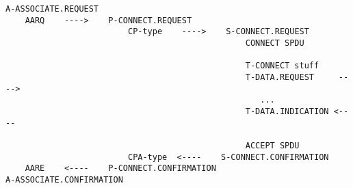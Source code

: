 \begin{bwslide}

\scriptsize
\begin{verbatim}
A-ASSOCIATE.REQUEST
    AARQ    ---->    P-CONNECT.REQUEST
                         CP-type    ---->    S-CONNECT.REQUEST
                                                 CONNECT SPDU

                                                 T-CONNECT stuff
                                                 T-DATA.REQUEST     ---->
                                                    ...
                                                 T-DATA.INDICATION <----

                                                 ACCEPT SPDU
                         CPA-type  <----    S-CONNECT.CONFIRMATION
    AARE    <----    P-CONNECT.CONFIRMATION
A-ASSOCIATE.CONFIRMATION
\end{verbatim}
\end{bwslide}


